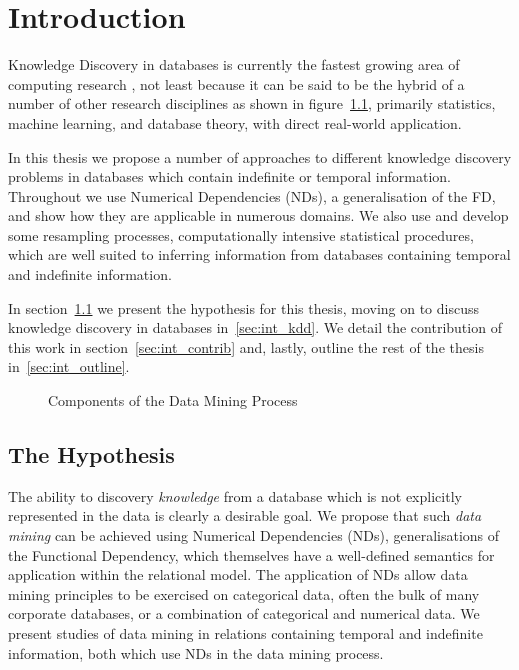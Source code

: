 \chapter{Introduction}\label{chap:intro}

Knowledge Discovery in databases is currently the fastest
growing area of computing research \cite{knowdisc91}, not least because it can be said
to be the hybrid of a number of other research disciplines as shown in
figure~\ref{fig:dm_process}, primarily statistics, machine learning,
and database theory, with direct real-world application.

\medskip

In this thesis we propose a number of approaches to different
knowledge discovery
problems in databases which contain indefinite or temporal
information. Throughout we use Numerical Dependencies (NDs), a
generalisation of the FD, and 
show how they are applicable in numerous domains.  We also use and develop some
resampling processes, computationally intensive statistical
procedures, which are well suited to inferring information from
databases containing temporal and indefinite information. 

In section~\ref{sec:int_hyp} we present the hypothesis for this
thesis, moving on to discuss knowledge discovery in databases
in~\ref{sec:int_kdd}. We detail the contribution of this work in
section~\ref{sec:int_contrib} and, lastly, outline the rest of the
thesis in~\ref{sec:int_outline}.

\begin{figure}
\centerline{}
\caption{\label{fig:dm_process}Components of the Data
Mining Process}
\end{figure}

\section{The Hypothesis}\label{sec:int_hyp}

The ability to discovery {\em knowledge} from a database which is not
explicitly represented in the data is clearly a desirable goal. We
propose that such {\em data mining} can be achieved using Numerical
Dependencies (NDs), generalisations of the Functional Dependency,
which themselves have a well-defined semantics for application within
the relational model. The application of NDs allow data
mining principles to be exercised on categorical data, often the bulk
of many corporate databases, or a combination of categorical and
numerical data. We present studies of data mining in
relations containing temporal and indefinite information, both which
use NDs in the data mining process.

